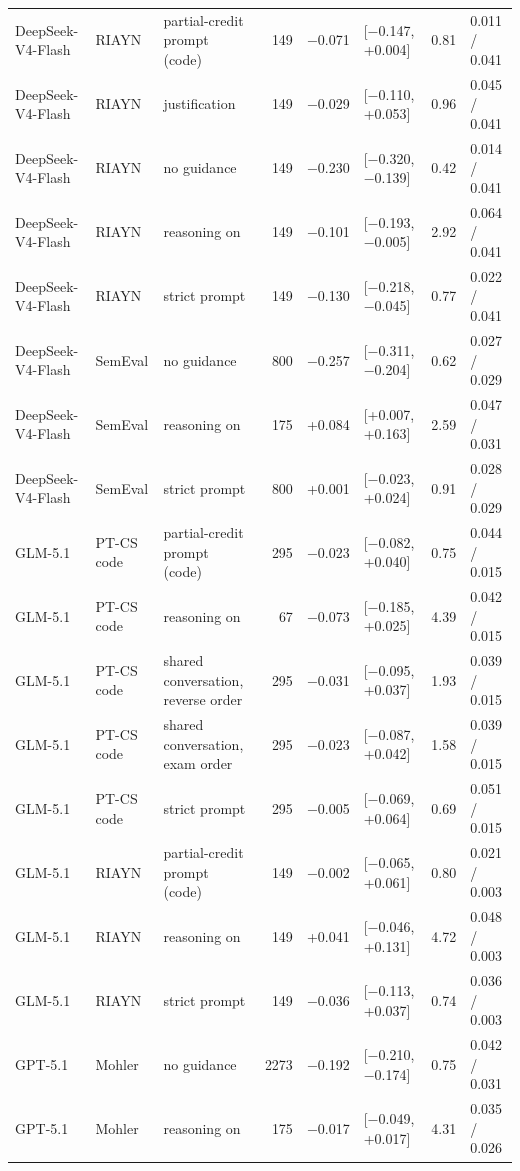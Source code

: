\documentclass[10pt]{article}
\begin{document}
\begin{longtable}{ll>{\raggedright\arraybackslash}p{3.1cm}rrlrl}
DeepSeek-V4-Flash & RIAYN & partial-credit prompt (code) & 149 & $-$0.071 & [$-$0.147, +0.004] & 0.81 & 0.011 / 0.041 \\
DeepSeek-V4-Flash & RIAYN & justification & 149 & $-$0.029 & [$-$0.110, +0.053] & 0.96 & 0.045 / 0.041 \\
DeepSeek-V4-Flash & RIAYN & no guidance & 149 & $-$0.230 & [$-$0.320, $-$0.139] & 0.42 & 0.014 / 0.041 \\
DeepSeek-V4-Flash & RIAYN & reasoning on & 149 & $-$0.101 & [$-$0.193, $-$0.005] & 2.92 & 0.064 / 0.041 \\
DeepSeek-V4-Flash & RIAYN & strict prompt & 149 & $-$0.130 & [$-$0.218, $-$0.045] & 0.77 & 0.022 / 0.041 \\
DeepSeek-V4-Flash & SemEval & no guidance & 800 & $-$0.257 & [$-$0.311, $-$0.204] & 0.62 & 0.027 / 0.029 \\
DeepSeek-V4-Flash & SemEval & reasoning on & 175 & +0.084 & [+0.007, +0.163] & 2.59 & 0.047 / 0.031 \\
DeepSeek-V4-Flash & SemEval & strict prompt & 800 & +0.001 & [$-$0.023, +0.024] & 0.91 & 0.028 / 0.029 \\
GLM-5.1 & PT-CS code & partial-credit prompt (code) & 295 & $-$0.023 & [$-$0.082, +0.040] & 0.75 & 0.044 / 0.015 \\
GLM-5.1 & PT-CS code & reasoning on & 67 & $-$0.073 & [$-$0.185, +0.025] & 4.39 & 0.042 / 0.015 \\
GLM-5.1 & PT-CS code & shared conversation, reverse order & 295 & $-$0.031 & [$-$0.095, +0.037] & 1.93 & 0.039 / 0.015 \\
GLM-5.1 & PT-CS code & shared conversation, exam order & 295 & $-$0.023 & [$-$0.087, +0.042] & 1.58 & 0.039 / 0.015 \\
GLM-5.1 & PT-CS code & strict prompt & 295 & $-$0.005 & [$-$0.069, +0.064] & 0.69 & 0.051 / 0.015 \\
GLM-5.1 & RIAYN & partial-credit prompt (code) & 149 & $-$0.002 & [$-$0.065, +0.061] & 0.80 & 0.021 / 0.003 \\
GLM-5.1 & RIAYN & reasoning on & 149 & +0.041 & [$-$0.046, +0.131] & 4.72 & 0.048 / 0.003 \\
GLM-5.1 & RIAYN & strict prompt & 149 & $-$0.036 & [$-$0.113, +0.037] & 0.74 & 0.036 / 0.003 \\
GPT-5.1 & Mohler & no guidance & 2273 & $-$0.192 & [$-$0.210, $-$0.174] & 0.75 & 0.042 / 0.031 \\
GPT-5.1 & Mohler & reasoning on & 175 & $-$0.017 & [$-$0.049, +0.017] & 4.31 & 0.035 / 0.026 \\

\end{longtable}
\end{document}
